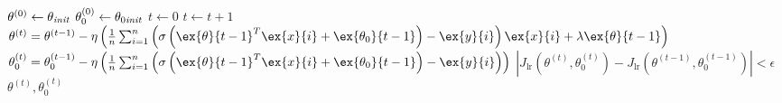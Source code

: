\documentclass[10pt,oneside]{book}
\begin{document}
\pagestyle{empty}
\thispagestyle{empty}

\begin{codebox}
  \li $\theta^{(0)} \gets \theta_{\it init}$
  \li $\theta_0^{(0)} \gets \theta_{0 {\it init}}$
  \li $t \gets 0$
  \li \Repeat
  \li   $t \gets t+1$
  \li   $\theta^{(t)} = \theta^{(t-1)} - \eta\left(\frac{1}{n}\sum_{i=1}^n
                    \left(\sigma\left({\ex{\theta}{t-1}}^T \ex{x}{i} + \ex{\theta_0}{t-1}\right) -
                    \ex{y}{i}\right) \ex{x}{i}
                    + \lambda\ex{\theta}{t-1}
                  \right)$
  \li   $\theta_0^{(t)} = \theta_0^{(t-1)} - \eta\left(\frac{1}{n}\sum_{i=1}^n
        \left(\sigma\left({\ex{\theta}{t-1}}^T \ex{x}{i} + \ex{\theta_0}{t-1}\right) -
                    \ex{y}{i} \right) 
        \right)$
        \li \Until $\left| J_{\text{lr}}(\theta^{(t)},\theta_0^{(t)}) - J_{\text{lr}}(\theta^{(t-1)},
        \theta_0^{(t-1)}) \right| <\epsilon$
  \li \Return $\theta^{(t)},\theta_0^{(t)}$
\end{codebox}
\end{document}
